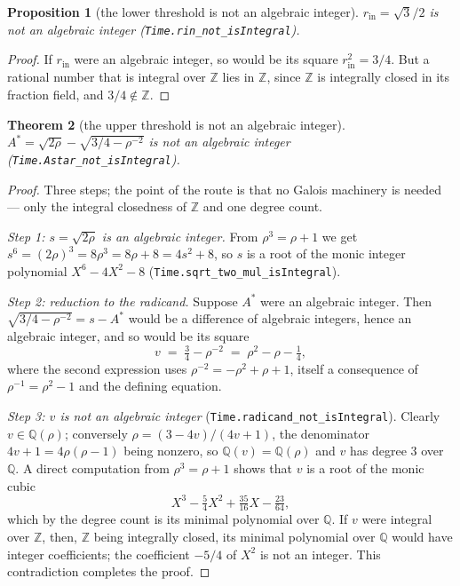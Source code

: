 \documentclass[11pt]{amsart}
\theoremstyle{plain}
\newtheorem{theorem}{Theorem}[section]
\newtheorem{proposition}[theorem]{Proposition}
\theoremstyle{definition}
\theoremstyle{remark}
\begin{document}
\begin{proposition}[the lower threshold is not an algebraic integer]\label{prop:rin-not-integral}
$r_{\mathrm{in}} = \sqrt{3}/2$ is not an algebraic integer \textup{(\texttt{Time.rin\_not\_isIntegral})}.
\end{proposition}

\begin{proof}
If $r_{\mathrm{in}}$ were an algebraic integer, so would be its square $r_{\mathrm{in}}^2 = 3/4$. But a rational number that is integral over $\mathbb{Z}$ lies in $\mathbb{Z}$, since $\mathbb{Z}$ is integrally closed in its fraction field, and $3/4 \notin \mathbb{Z}$.
\end{proof}

\begin{theorem}[the upper threshold is not an algebraic integer]\label{thm:astar-not-integral}
$A^{*} = \sqrt{2\rho} - \sqrt{3/4 - \rho^{-2}}$ is not an algebraic integer \textup{(\texttt{Time.Astar\_not\_isIntegral})}.
\end{theorem}

\begin{proof}
Three steps; the point of the route is that no Galois machinery is needed --- only the integral closedness of $\mathbb{Z}$ and one degree count.

\emph{Step 1: $s = \sqrt{2\rho}$ is an algebraic integer.} From $\rho^3 = \rho + 1$ we get $s^6 = (2\rho)^3 = 8\rho^3 = 8\rho + 8 = 4s^2 + 8$, so $s$ is a root of the monic integer polynomial $X^6 - 4X^2 - 8$ \textup{(\texttt{Time.sqrt\_two\_mul\_isIntegral})}.

\emph{Step 2: reduction to the radicand.} Suppose $A^{*}$ were an algebraic integer. Then $\sqrt{3/4 - \rho^{-2}} = s - A^{*}$ would be a difference of algebraic integers, hence an algebraic integer, and so would be its square
\[
v \;=\; \tfrac{3}{4} - \rho^{-2} \;=\; \rho^2 - \rho - \tfrac{1}{4},
\]
where the second expression uses $\rho^{-2} = -\rho^2 + \rho + 1$, itself a consequence of $\rho^{-1} = \rho^2 - 1$ and the defining equation.

\emph{Step 3: $v$ is not an algebraic integer} \textup{(\texttt{Time.radicand\_not\_isIntegral})}. Clearly $v \in \mathbb{Q}(\rho)$; conversely $\rho = (3 - 4v)/(4v + 1)$, the denominator $4v + 1 = 4\rho(\rho - 1)$ being nonzero, so $\mathbb{Q}(v) = \mathbb{Q}(\rho)$ and $v$ has degree $3$ over $\mathbb{Q}$. A direct computation from $\rho^3 = \rho + 1$ shows that $v$ is a root of the monic cubic
\[
X^3 - \tfrac{5}{4} X^2 + \tfrac{35}{16} X - \tfrac{23}{64},
\]
which by the degree count is its minimal polynomial over $\mathbb{Q}$. If $v$ were integral over $\mathbb{Z}$, then, $\mathbb{Z}$ being integrally closed, its minimal polynomial over $\mathbb{Q}$ would have integer coefficients; the coefficient $-5/4$ of $X^2$ is not an integer. This contradiction completes the proof.
\end{proof}
\end{document}
